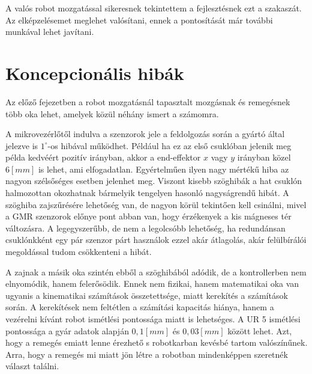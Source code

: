 A valós robot mozgatással sikeresnek tekintettem a fejlesztésnek ezt a szakaszát. Az elképzelésemet meglehet valósítani, ennek a pontosítását már további munkával lehet javítani. 

\section{Koncepcionális hibák}

Az előző fejezetben a robot mozgatásnál tapasztalt mozgásnak és remegésnek több oka lehet, amelyek közül néhány ismert a számomra.

A mikrovezérlőtől indulva a szenzorok jele a feldolgozás során a gyártó által jelezve is $1^\circ$-os hibával működhet. Például ha ez az első csuklóban jelenik meg példa kedvéért pozitív irányban, akkor a end-effektor $x$ vagy $y$ irányban közel $6[mm]$ is lehet, ami elfogadatlan. Egyértelműen ilyen nagy mértékű hiba az nagyon szélsőséges esetben jelenhet meg. Viszont kisebb szöghibák a hat csuklón halmozottan okozhatnak bármelyik tengelyen hasonló nagyságrendű hibát. A szöghiba zajszűrésére lehetőség van, de nagyon körül tekintően kell csinálni, mivel a GMR szenzorok előnye pont abban van, hogy érzékenyek a kis mágneses tér változásra. A legegyszerűbb, de nem a legolcsóbb lehetőség, ha redundánsan csuklónkként egy pár szenzor párt használok ezzel akár átlagolás, akár felülbírálói megoldással tudom csökkenteni a hibát.

A zajnak a másik oka szintén ebből a szöghibából adódik, de a kontrollerben nem elnyomódik, hanem felerősödik. Ennek nem fizikai, hanem matematikai oka van ugyanis a kinematikai számítások összetettsége, miatt kerekítés a számítások során. A kerekítések nem feltétlen a számítási kapacitás hiánya, hanem a vezérelni kívánt robot ismétlési pontossága miatt is lehetséges. A UR 5 ismétlési pontossága a gyár adatok alapján $0,1[mm]$ és $0,03[mm]$ között lehet. Azt, hogy a remegés emiatt lenne érezhető s robotkarban kevésbé tartom valószínűnek. Arra, hogy a remegés mi miatt jön létre a robotban mindenképpen szeretnék választ találni.